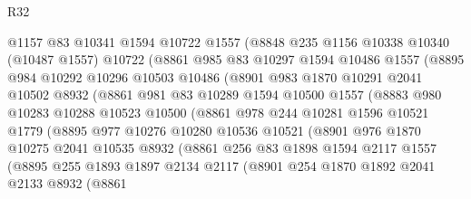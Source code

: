 \begin{lexlean}{R32}
\begin{coremodule}
            @1157
            @83
            @10341
            @1594
            @10722
            @1557
            (@8848
              @235
              @1156
              @10338
              @10340
              (@10487 @1557)
              @10722
              (@8861
                @985
                @83
                @10297
                @1594
                @10486
                @1557
                (@8895
                  @984
                  @10292
                  @10296
                  @10503
                  @10486
                  (@8901
                    @983
                    @1870
                    @10291
                    @2041
                    @10502
                    @8932
                    (@8861
                      @981
                      @83
                      @10289
                      @1594
                      @10500
                      @1557
                      (@8883
                        @980
                        @10283
                        @10288
                        @10523
                        @10500
                        (@8861
                          @978
                          @244
                          @10281
                          @1596
                          @10521
                          @1779
                          (@8895
                            @977
                            @10276
                            @10280
                            @10536
                            @10521
                            (@8901
                              @976
                              @1870
                              @10275
                              @2041
                              @10535
                              @8932
                              (@8861
                                @256
                                @83
                                @1898
                                @1594
                                @2117
                                @1557
                                (@8895
                                  @255
                                  @1893
                                  @1897
                                  @2134
                                  @2117
                                  (@8901
                                    @254
                                    @1870
                                    @1892
                                    @2041
                                    @2133
                                    @8932
                                    (@8861

\end{coremodule}
\end{lexlean}
